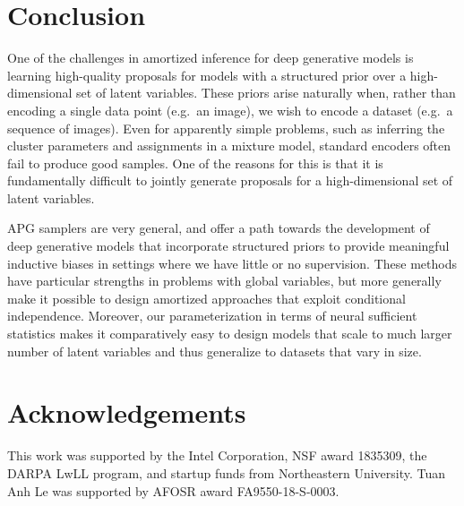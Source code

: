 \documentclass{article}
\theoremstyle{definition}
\begin{document}
\section{Conclusion}
One of the challenges in amortized inference for deep generative models is learning high-quality proposals for models with a structured prior over a high-dimensional set of latent variables. These priors arise naturally when, rather than encoding a single data point (e.g.~an image), we wish to encode a dataset (e.g.~a sequence of images). 
Even for apparently simple problems, such as inferring the cluster parameters and assignments in a mixture model, standard encoders often fail to produce good samples. One of the reasons for this is that it is fundamentally difficult to jointly generate proposals for a high-dimensional set of latent variables.

APG samplers are very general, and offer a path towards the development of deep generative models that incorporate structured priors to provide meaningful inductive biases in settings where we have little or no supervision. These methods have particular strengths in problems with global variables, but more generally make it possible to design amortized approaches that exploit conditional independence. Moreover, our parameterization in terms of neural sufficient statistics makes it comparatively easy to design models that scale to much larger number of latent variables and thus generalize to datasets that vary in size. 


\section{Acknowledgements}

This work was supported by the Intel Corporation, NSF award 1835309, the DARPA LwLL program, and startup funds from Northeastern University. Tuan Anh Le was supported by AFOSR award FA9550-18-S-0003.




\newpage
\appendix
\onecolumn
{}
\end{document}
